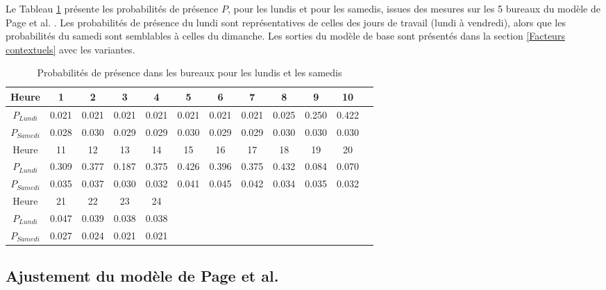 Le Tableau \ref{tab:PPage} présente les probabilités de présence $P$, pour les lundis et pour les samedis, issues des mesures sur les 5 bureaux du modèle de Page et al. \cite{Page-08}. Les probabilités de présence du lundi sont représentatives de celles des jours de travail (lundi à vendredi), alors que les probabilités du samedi sont semblables à celles du dimanche. Les sorties du modèle de base sont présentés dans la section \ref{Facteurs contextuels} avec les variantes.

\begin{table}[H]
\centering
\begin{tabular}{|c|c|c|c|c|c|c|c|c|c|c|c|}
\hline 
Heure & 1 & 2 & 3 & 4 & 5 & 6 & 7 & 8 & 9 & 10  \\ 
\hline 
$P_{Lundi}$ & 0.021 & 0.021 & 0.021 & 0.021 & 0.021 & 0.021 & 0.021 & 0.025 & 0.250 & 0.422  \\ 
\hline 
$P_{Samedi}$ & 0.028 & 0.030 & 0.029 & 0.029 & 0.030 & 0.029 & 0.029 & 0.030 & 0.030 & 0.030  \\ 
\hline
\hline
Heure & 11 & 12 & 13 & 14 & 15 & 16 & 17 & 18 & 19 & 20 \\ 
\hline 
$P_{Lundi}$ & 0.309 & 0.377 & 0.187 & 0.375 & 0.426 & 0.396 & 0.375 & 0.432 & 0.084 & 0.070 \\ 
\hline 
$P_{Samedi}$ & 0.035 & 0.037 & 0.030 & 0.032 & 0.041 & 0.045 & 0.042 & 0.034 & 0.035 & 0.032 \\ 
\hline 
\hline
Heure & 21 & 22 & 23 & 24 & \cellcolor{lightgray}& \cellcolor{lightgray}& \cellcolor{lightgray}& \cellcolor{lightgray}& \cellcolor{lightgray}& \cellcolor{lightgray}\\ 
\hline 
$P_{Lundi}$ & 0.047 & 0.039 & 0.038 & 0.038 & \cellcolor{lightgray} &\cellcolor{lightgray} &\cellcolor{lightgray} &\cellcolor{lightgray} &\cellcolor{lightgray} & \cellcolor{lightgray}\\ 
\hline 
$P_{Samedi}$ & 0.027 & 0.024 & 0.021 & 0.021 &\cellcolor{lightgray} &\cellcolor{lightgray} &\cellcolor{lightgray} & \cellcolor{lightgray}&\cellcolor{lightgray} &\cellcolor{lightgray} \\
\hline 
\end{tabular}
\caption{Probabilités de présence dans les bureaux pour les lundis et les samedis}
\label{tab:PPage}
\end{table}

\subsection{Ajustement du modèle de Page et al.}
\label{AjustementPage}

